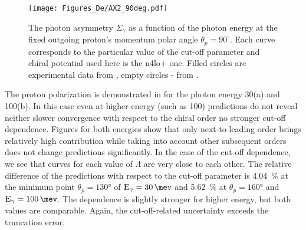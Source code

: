     \begin{figure}[h]
        \begin{center}
        \texttt{[image: Figures\_De/AX2\_90deg.pdf]}
        \end{center}
        \caption{The photon asymmetry $\Sigma_\gamma$ 
        as a function of the photon energy  
        at the fixed outgoing proton's momentum polar angle $\theta_p=90^\circ$.
        Each curve corresponds to the particular value of the cut-off parameter
        and chiral potential used here is the \gls{n4lo+} one.
        Filled circles are experimental data from \cite{delbianco_1981},
        empty circles - from \cite{depascale_asymmetry}.}
        \label{asymmetry_90deg}
    \end{figure}
    

    The proton polarization is demonstrated in  for the 
    photon energy \SI{30}{\mev}(a) and \SI{100}{\mev}(b).
    In this case even at higher energy
    (such as \SI{100}{\mev}) predictions do not reveal neither
    slower convergence with respect to the chiral order no
    stronger cut-off dependence. Figures for both energies show
    that only next-to-leading order brings relatively high contribution
    while taking into account other subsequent orders does not change predictions
    significantly. In the case of the cut-off dependence, we see that curves for each
    value of $\Lambda$ are very close to each other. 
    The relative difference of the predictions with respect to the cut-off parameter
    is \SI{4.04}{\percent} at the minimum point $\theta_p=\ang{130}$ of $\text{E}_\gamma = \SI{30}{\mev}$
    and \SI{5.62}{\percent} at $\theta_p=\ang{160}$ and $\text{E}_\gamma = \SI{100}{\mev}$.
    The dependence is slightly stronger for higher energy, but both values are comparable.
    Again, the cut-off-related uncertainty exceeds the truncation error.

